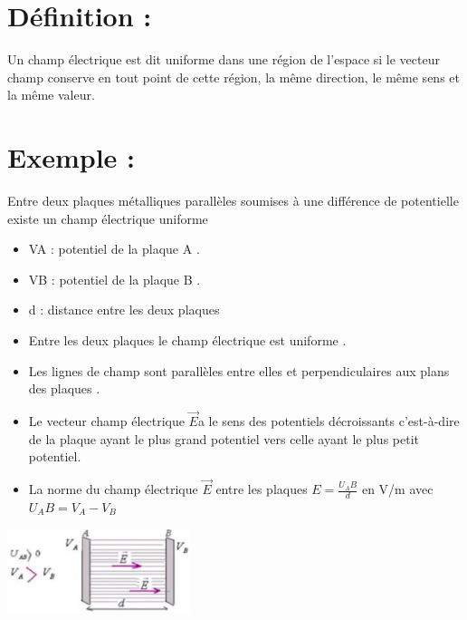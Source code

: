 \documentclass[12pt]{article}
\begin{document}
\section{ Définition :}
Un champ électrique est dit uniforme dans une région de l'espace si le vecteur champ conserve en tout point de cette région, la même
direction, le même sens et la même valeur.
\section{Exemple : }
Entre deux plaques métalliques parallèles soumises à une différence de potentielle existe un champ électrique uniforme

\begin{itemize}
      \item VA : potentiel de la plaque A .
      \item VB : potentiel de la plaque B .
      \item d : distance entre les deux plaques
      \item Entre les deux plaques le champ électrique est uniforme .
      \item Les lignes de champ sont parallèles entre elles et perpendiculaires aux plans des plaques .
         \item Le vecteur champ électrique $\vec{E}$a le sens des potentiels décroissants c'est-à-dire de la plaque ayant le plus grand potentiel vers celle ayant le plus petit potentiel.
         \item La norme du champ électrique $\vec{E}$ entre les plaques  $E = \frac{U_AB}{d}$ en  V/m avec $U_AB = V_A-V_B$
\end{itemize}

\begin{center}
    \includegraphics[width=0.4\textwidth]{./img/img_07.png}
\end{center}
\end{document}
